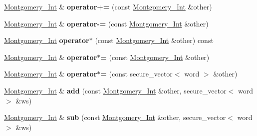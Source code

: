 \begin{DoxyCompactItemize}
\mbox{\hyperlink{class_botan_1_1_montgomery___int}{Montgomery\+\_\+\+Int}} \& {\bfseries operator+=} (const \mbox{\hyperlink{class_botan_1_1_montgomery___int}{Montgomery\+\_\+\+Int}} \&other)
\item 
\mbox{\label{class_botan_1_1_montgomery___int_a4508b0c722c080f3695ee3956c19ebe8}} 
\mbox{\hyperlink{class_botan_1_1_montgomery___int}{Montgomery\+\_\+\+Int}} \& {\bfseries operator-\/=} (const \mbox{\hyperlink{class_botan_1_1_montgomery___int}{Montgomery\+\_\+\+Int}} \&other)
\item 
\mbox{\label{class_botan_1_1_montgomery___int_a772e1acf4bd278ac8c2090d1bf379283}} 
\mbox{\hyperlink{class_botan_1_1_montgomery___int}{Montgomery\+\_\+\+Int}} {\bfseries operator$\ast$} (const \mbox{\hyperlink{class_botan_1_1_montgomery___int}{Montgomery\+\_\+\+Int}} \&other) const
\item 
\mbox{\label{class_botan_1_1_montgomery___int_a032c01d5f7dac98b81a714668feda921}} 
\mbox{\hyperlink{class_botan_1_1_montgomery___int}{Montgomery\+\_\+\+Int}} \& {\bfseries operator$\ast$=} (const \mbox{\hyperlink{class_botan_1_1_montgomery___int}{Montgomery\+\_\+\+Int}} \&other)
\item 
\mbox{\label{class_botan_1_1_montgomery___int_a3747b27aac7135b3d689c6a7fb93cca4}} 
\mbox{\hyperlink{class_botan_1_1_montgomery___int}{Montgomery\+\_\+\+Int}} \& {\bfseries operator$\ast$=} (const secure\+\_\+vector$<$ word $>$ \&other)
\item 
\mbox{\label{class_botan_1_1_montgomery___int_a28fc489284579cd00072e962298bc177}} 
\mbox{\hyperlink{class_botan_1_1_montgomery___int}{Montgomery\+\_\+\+Int}} \& {\bfseries add} (const \mbox{\hyperlink{class_botan_1_1_montgomery___int}{Montgomery\+\_\+\+Int}} \&other, secure\+\_\+vector$<$ word $>$ \&ws)
\item 
\mbox{\label{class_botan_1_1_montgomery___int_a9f7882321bd8b3249b7a1d5f61124e9f}} 
\mbox{\hyperlink{class_botan_1_1_montgomery___int}{Montgomery\+\_\+\+Int}} \& {\bfseries sub} (const \mbox{\hyperlink{class_botan_1_1_montgomery___int}{Montgomery\+\_\+\+Int}} \&other, secure\+\_\+vector$<$ word $>$ \&ws)

\end{DoxyCompactItemize}
